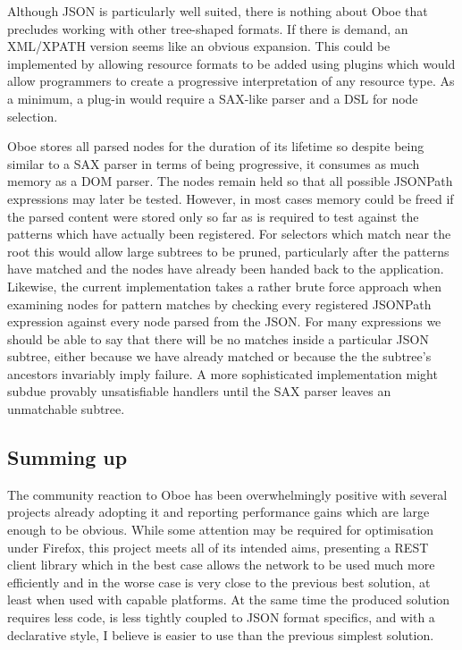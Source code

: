 \documentclass[12pt, ]{article}
\begin{document}
Although JSON is particularly well suited, there is nothing about Oboe
that precludes working with other tree-shaped formats. If there is
demand, an XML/XPATH version seems like an obvious expansion. This could
be implemented by allowing resource formats to be added using plugins
which would allow programmers to create a progressive interpretation of
any resource type. As a minimum, a plug-in would require a SAX-like
parser and a DSL for node selection.

Oboe stores all parsed nodes for the duration of its lifetime so despite
being similar to a SAX parser in terms of being progressive, it consumes
as much memory as a DOM parser. The nodes remain held so that all
possible JSONPath expressions may later be tested. However, in most
cases memory could be freed if the parsed content were stored only so
far as is required to test against the patterns which have actually been
registered. For selectors which match near the root this would allow
large subtrees to be pruned, particularly after the patterns have
matched and the nodes have already been handed back to the application.
Likewise, the current implementation takes a rather brute force approach
when examining nodes for pattern matches by checking every registered
JSONPath expression against every node parsed from the JSON. For many
expressions we should be able to say that there will be no matches
inside a particular JSON subtree, either because we have already matched
or because the the subtree's ancestors invariably imply failure. A more
sophisticated implementation might subdue provably unsatisfiable
handlers until the SAX parser leaves an unmatchable subtree.

\subsection{Summing up}\label{summing-up}

The community reaction to Oboe has been overwhelmingly positive with
several projects already adopting it and reporting performance gains
which are large enough to be obvious. While some attention may be
required for optimisation under Firefox, this project meets all of its
intended aims, presenting a REST client library which in the best case
allows the network to be used much more efficiently and in the worse
case is very close to the previous best solution, at least when used
with capable platforms. At the same time the produced solution requires
less code, is less tightly coupled to JSON format specifics, and with a
declarative style, I believe is easier to use than the previous simplest
solution.
\end{document}
